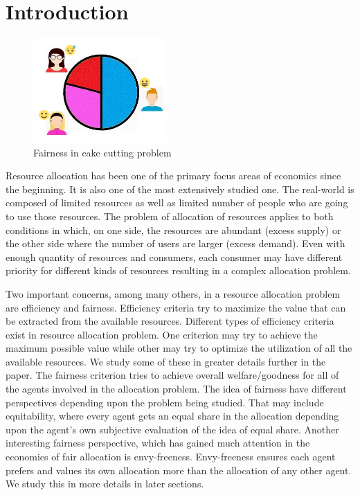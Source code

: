 \section{Introduction}
\label{section_intro}

\begin{figure}
\includegraphics[width=2in]{images/cake_cutting.png}
\caption{Fairness in cake cutting problem}
\end{figure}

Resource allocation has been one of the primary focus areas of economics since the beginning. It is also one of the most extensively studied one. The real-world is composed of limited resources as well as limited number of people who are going to use those resources. The problem of allocation of resources applies to both conditions in which, on one side, the resources are abundant (excess supply) or the other side where the number of users are larger (excess demand). Even with enough quantity of resources and consumers, each consumer may have different priority for different kinds of resources resulting in a complex allocation problem.

Two important concerns, among many others, in a resource allocation problem are efficiency and fairness. Efficiency criteria try to maximize the value that can be extracted from the available resources. Different types of efficiency criteria exist in resource allocation problem. One criterion may try to achieve the maximum possible value while other may try to optimize the utilization of all the available resources. We study some of these in greater details further in the paper. The fairness criterion tries to achieve overall welfare/goodness for all of the agents involved in the allocation problem. The idea of fairness have different perspectives depending upon the problem being studied. That may include equitability, where every agent gets an equal share in the allocation depending upon the agent's own subjective evaluation of the idea of equal share. Another interesting fairness perspective, which has gained much attention in the economics of fair allocation is envy-freeness. Envy-freeness ensures each agent prefers and values its own allocation more than the allocation of any other agent. We study this in more details in later sections.

